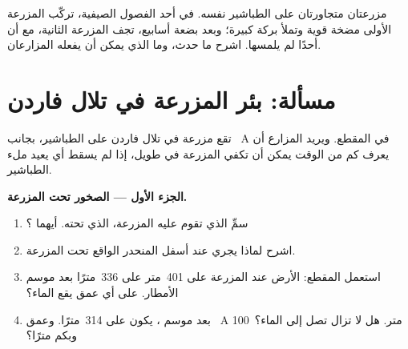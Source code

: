 \begin{exercise}[$\star\star\star$]\label{exo:g6:water-underground:12}
مزرعتان متجاورتان على الطباشير نفسه. في أحد الفصول الصيفية، تركّب المزرعة الأولى
مضخة قوية وتملأ بركة كبيرة؛ وبعد بضعة أسابيع، تجف
 المزرعة الثانية، مع أن أحدًا لم يلمسها. اشرح ما
حدث، وما الذي يمكن أن يفعله المزارعان.
\end{exercise}

\section{مسألة: بئر المزرعة في تلال فاردن}

\begin{problem}
\label{pb:g6:water-underground:1}
تقع مزرعة في تلال فاردن على الطباشير، بجانب ~A في
المقطع. ويريد المزارع أن يعرف كم من الوقت يمكن أن تكفي  المزرعة
في  طويل، إذا لم يسقط أي  يعيد ملء الطباشير.

\medskip
\noindent\textbf{الجزء الأول --- الصخور تحت المزرعة.}
\begin{enumerate}
  \item سمِّ  الذي تقوم عليه المزرعة،  الذي تحته. أيهما
        ؟
  \item اشرح لماذا يجري  عند أسفل المنحدر الواقع تحت المزرعة.
  \item استعمل المقطع: الأرض عند المزرعة على  401~متر  على  336~مترًا بعد موسم الأمطار. على أي عمق يقع الماء؟
  \item بعد موسم ، يكون  على  314~مترًا. وعمق ~A
        100~متر. هل لا تزال تصل إلى الماء؟ وبكم مترًا؟
\end{enumerate}


\end{problem}
